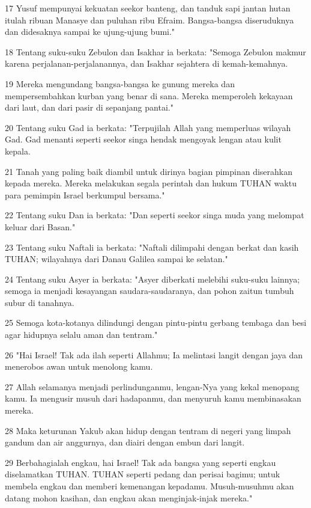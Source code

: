 \par 17 Yusuf mempunyai kekuatan seekor banteng, dan tanduk sapi jantan hutan itulah ribuan Manasye dan puluhan ribu Efraim. Bangsa-bangsa diseruduknya dan didesaknya sampai ke ujung-ujung bumi."
\par 18 Tentang suku-suku Zebulon dan Isakhar ia berkata: "Semoga Zebulon makmur karena perjalanan-perjalanannya, dan Isakhar sejahtera di kemah-kemahnya.
\par 19 Mereka mengundang bangsa-bangsa ke gunung mereka dan mempersembahkan kurban yang benar di sana. Mereka memperoleh kekayaan dari laut, dan dari pasir di sepanjang pantai."
\par 20 Tentang suku Gad ia berkata: "Terpujilah Allah yang memperluas wilayah Gad. Gad menanti seperti seekor singa hendak mengoyak lengan atau kulit kepala.
\par 21 Tanah yang paling baik diambil untuk dirinya bagian pimpinan diserahkan kepada mereka. Mereka melakukan segala perintah dan hukum TUHAN waktu para pemimpin Israel berkumpul bersama."
\par 22 Tentang suku Dan ia berkata: "Dan seperti seekor singa muda yang melompat keluar dari Basan."
\par 23 Tentang suku Naftali ia berkata: "Naftali dilimpahi dengan berkat dan kasih TUHAN; wilayahnya dari Danau Galilea sampai ke selatan."
\par 24 Tentang suku Asyer ia berkata: "Asyer diberkati melebihi suku-suku lainnya; semoga ia menjadi kesayangan saudara-saudaranya, dan pohon zaitun tumbuh subur di tanahnya.
\par 25 Semoga kota-kotanya dilindungi dengan pintu-pintu gerbang tembaga dan besi agar hidupnya selalu aman dan tentram."
\par 26 "Hai Israel! Tak ada ilah seperti Allahmu; Ia melintasi langit dengan jaya dan menerobos awan untuk menolong kamu.
\par 27 Allah selamanya menjadi perlindunganmu, lengan-Nya yang kekal menopang kamu. Ia mengusir musuh dari hadapanmu, dan menyuruh kamu membinasakan mereka.
\par 28 Maka keturunan Yakub akan hidup dengan tentram di negeri yang limpah gandum dan air anggurnya, dan diairi dengan embun dari langit.
\par 29 Berbahagialah engkau, hai Israel! Tak ada bangsa yang seperti engkau diselamatkan TUHAN. TUHAN seperti pedang dan perisai bagimu; untuk membela engkau dan memberi kemenangan kepadamu. Musuh-musuhmu akan datang mohon kasihan, dan engkau akan menginjak-injak mereka."

